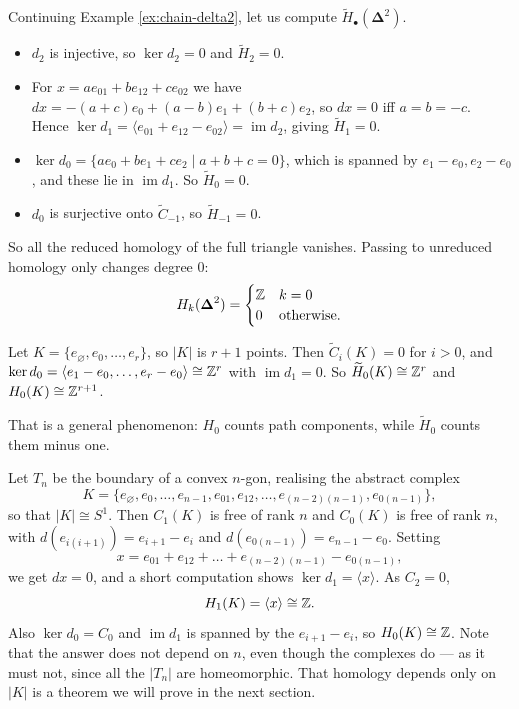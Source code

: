 \documentclass[a4paper]{scrartcl}
\newcommand{\genby}[1]{\langle #1 \rangle}
\newcommand{\bDelta}{\boldsymbol{\Delta}}
\begin{document}
\begin{example} \label{ex:homology-delta2}
	Continuing Example \ref{ex:chain-delta2}, let us compute $\widetilde H_\bullet(\bDelta^2)$.
	\begin{itemize}
		\item $d_2$ is injective, so $\ker d_2 = 0$ and $\widetilde H_2 = 0$.
		\item For $x = ae_{01}+be_{12}+ce_{02}$ we have $dx = -(a+c)e_0 + (a-b)e_1 + (b+c)e_2$, so $dx = 0$ iff $a = b = -c$. Hence $\ker d_1 = \genby{e_{01}+e_{12}-e_{02}} = \operatorname{im}d_2$, giving $\widetilde H_1 = 0$.
		\item $\ker d_0 = \{ae_0+be_1+ce_2 \mid a+b+c = 0\}$, which is spanned by $e_1-e_0, e_2-e_0$, and these lie in $\operatorname{im}d_1$. So $\widetilde H_0 = 0$.
		\item $d_0$ is surjective onto $\widetilde C_{-1}$, so $\widetilde H_{-1} = 0$.
	\end{itemize}
	So all the reduced homology of the full triangle vanishes. Passing to unreduced homology only changes degree $0$:
	$$
	H_k(\bDelta^2) = \begin{cases}\Z & k = 0\\ 0 & \text{otherwise.}\end{cases}
	$$
\end{example}

\begin{example} \label{ex:homology-points}
	Let $K = \{e_\varnothing, e_0, \dots, e_r\}$, so $|K|$ is $r+1$ points. Then $\widetilde C_i(K) = 0$ for $i > 0$, and $\ker d_0 = \genby{e_1-e_0,\dots,e_r-e_0} \cong \Z^r$ with $\operatorname{im}d_1 = 0$. So $\widetilde H_0(K) \cong \mathbb{Z}^r$ and $H_0(K) \cong \mathbb{Z}^{r+1}$.
\end{example}

That is a general phenomenon: $H_0$ counts path components, while $\widetilde H_0$ counts
them minus one.

\begin{example} \label{ex:homology-circle}
	Let $T_n$ be the boundary of a convex $n$-gon, realising the abstract complex
	$$
	K = \{e_\varnothing, e_0,\dots,e_{n-1}, e_{01},e_{12},\dots,e_{(n-2)(n-1)}, e_{0(n-1)}\},
	$$
	so that $|K| \cong S^1$. Then $C_1(K)$ is free of rank $n$ and $C_0(K)$ is free of rank $n$, with $d(e_{i(i+1)}) = e_{i+1}-e_i$ and $d(e_{0(n-1)}) = e_{n-1}-e_0$. Setting
	$$
	x = e_{01}+e_{12}+\dots+e_{(n-2)(n-1)} - e_{0(n-1)},
	$$
	we get $dx = 0$, and a short computation shows $\ker d_1 = \genby{x}$. As $C_2 = 0$,
	$$
	H_1(K) = \genby{x} \cong \Z.
	$$
	Also $\ker d_0 = C_0$ and $\operatorname{im}d_1$ is spanned by the $e_{i+1}-e_i$, so $H_0(K) \cong \mathbb{Z}$. Note that the answer does not depend on $n$, even though the complexes do --- as it must not, since all the $|T_n|$ are homeomorphic. That homology depends only on $|K|$ is a theorem we will prove in the next section.
\end{example}
\end{document}
